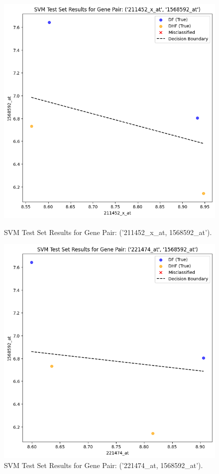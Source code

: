 \documentclass[final]{article}
\begin{document}
        \begin{figure}[H]
            \centering
            \begin{minipage}{0.45\textwidth}
                \includegraphics[width=\textwidth]{SVM (211452_x_at, 1568592_at).png}
                \caption{SVM Test Set Results for Gene Pair: ('211452\_x\_at, 1568592\_at').}
            \end{minipage}
            \hfill
            \begin{minipage}{0.45\textwidth}
                \includegraphics[width=\textwidth]{SVM (221474_at, 1568592_at).png}
                \caption{SVM Test Set Results for Gene Pair: ('221474\_at, 1568592\_at').}
            \end{minipage}
        \end{figure}
\end{document}
